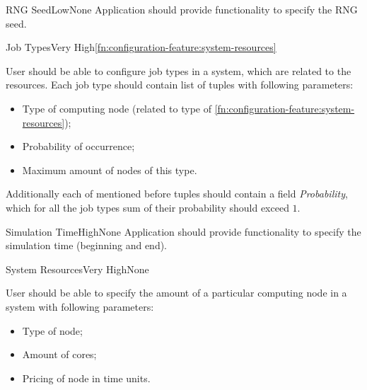 	\begin{functional}{\gls{RNG} Seed}{Low}{None}
		\label{fn:configuration-feature:rng-seed}
		{
			Application should provide functionality to specify the \gls{RNG} seed.
		}
	\end{functional}

	\begin{functional}{Job Types}{Very High}{\ref{fn:configuration-feature:system-resources}}
		\label{fn:configuration-feature:job-types}
		{
			User should be able to configure job types in a system, which are related to the resources. Each job type should contain list of tuples with following parameters:
			\begin{itemize}
				\item Type of \gls{computing node} (related to type of \ref{fn:configuration-feature:system-resources});
				\item Probability of occurrence;
				\item Maximum amount of nodes of this type.
			\end{itemize}
			Additionally each of mentioned before tuples should contain a field \emph{Probability}, which for all the job types sum of their probability should exceed $1$.
		}
	\end{functional}

	\begin{functional}{Simulation Time}{High}{None}
		\label{fn:configuration-feature:simulation-time}
		{
			Application should provide functionality to specify the simulation time (beginning and end). 
		}
	\end{functional}

	\begin{functional}{System Resources}{Very High}{None}
		\label{fn:configuration-feature:system-resources}
		{
			User should be able to specify the amount of a particular \gls{computing node} in a system with following parameters:
			\begin{itemize}
				\item Type of node;
				\item Amount of cores;
				\item Pricing of node in time units.
			\end{itemize}
		}
	\end{functional}

